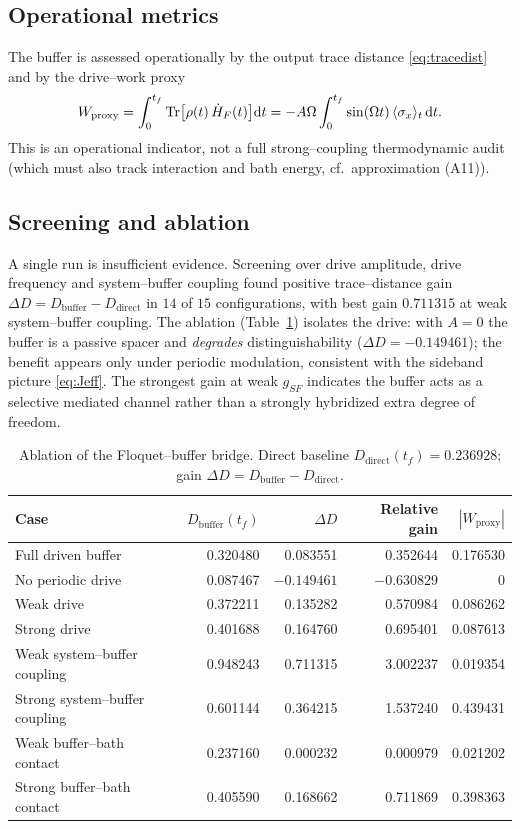 \documentclass[11pt,a4paper]{article}
\theoremstyle{plain}
\theoremstyle{definition}
\theoremstyle{remark}
\renewcommand{\d}{\mathrm{d}}
\begin{document}
\subsection{Operational metrics}
The buffer is assessed operationally by the output trace distance
\eqref{eq:tracedist} and by the drive--work proxy
\begin{equation}
W_{\mathrm{proxy}}=\int_0^{t_f}\Tr\!\big[\rho(t)\,\dot H_F(t)\big]\d t
=-A\Omega\int_0^{t_f}\sin(\Omega t)\,\langle\sigma_x\rangle_t\,\d t .
\label{eq:wproxy}
\end{equation}
This is an operational indicator, not a full strong--coupling
thermodynamic audit (which must also track interaction and bath energy,
cf.\ approximation (A11)).

\subsection{Screening and ablation}
A single run is insufficient evidence. Screening over drive amplitude,
drive frequency and system--buffer coupling found positive trace--distance
gain $\Delta D=D_{\mathrm{buffer}}-D_{\mathrm{direct}}$ in $14$ of $15$
configurations, with best gain $0.711315$ at weak system--buffer coupling.
The ablation (Table~\ref{tab:ablation}) isolates the drive: with $A=0$ the
buffer is a passive spacer and \emph{degrades} distinguishability
($\Delta D=-0.149461$); the benefit appears only under periodic
modulation, consistent with the sideband picture \eqref{eq:Jeff}. The
strongest gain at weak $g_{SF}$ indicates the buffer acts as a selective
mediated channel rather than a strongly hybridized extra degree of
freedom.

\begin{table}[H]\centering\small
\caption{Ablation of the Floquet--buffer bridge. Direct baseline
$D_{\mathrm{direct}}(t_f)=0.236928$; gain
$\Delta D=D_{\mathrm{buffer}}-D_{\mathrm{direct}}$.}
\label{tab:ablation}
\begin{tabular}{lrrrr}
\toprule
Case & $D_{\mathrm{buffer}}(t_f)$ & $\Delta D$ & Relative gain & $|W_{\mathrm{proxy}}|$ \\
\midrule
Full driven buffer & 0.320480 & 0.083551 & 0.352644 & 0.176530 \\
No periodic drive & 0.087467 & $-0.149461$ & $-0.630829$ & 0 \\
Weak drive & 0.372211 & 0.135282 & 0.570984 & 0.086262 \\
Strong drive & 0.401688 & 0.164760 & 0.695401 & 0.087613 \\
Weak system--buffer coupling & 0.948243 & 0.711315 & 3.002237 & 0.019354 \\
Strong system--buffer coupling & 0.601144 & 0.364215 & 1.537240 & 0.439431 \\
Weak buffer--bath contact & 0.237160 & 0.000232 & 0.000979 & 0.021202 \\
Strong buffer--bath contact & 0.405590 & 0.168662 & 0.711869 & 0.398363 \\
\bottomrule
\end{tabular}
\end{table}
\end{document}

